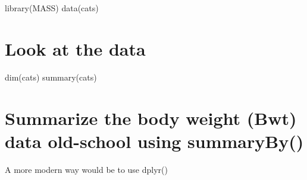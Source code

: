 \documentclass[
]{book}
\newenvironment{Shaded}{\begin{snugshade}}{\end{snugshade}}
\newcommand{\AttributeTok}[1]{\textcolor[rgb]{0.77,0.63,0.00}{#1}}
\newcommand{\CommentTok}[1]{\textcolor[rgb]{0.56,0.35,0.01}{\textit{#1}}}
\newcommand{\FunctionTok}[1]{\textcolor[rgb]{0.00,0.00,0.00}{#1}}
\newcommand{\NormalTok}[1]{#1}
\newcommand{\OtherTok}[1]{\textcolor[rgb]{0.56,0.35,0.01}{#1}}
\newcommand{\SpecialCharTok}[1]{\textcolor[rgb]{0.00,0.00,0.00}{#1}}
\begin{document}
\begin{Shaded}
\begin{Highlighting}[]
\FunctionTok{library}\NormalTok{(MASS)}
\FunctionTok{data}\NormalTok{(cats)}
\end{Highlighting}
\end{Shaded}

\hypertarget{look-at-the-data}{%
\section{Look at the data}\label{look-at-the-data}}

\begin{Shaded}
\begin{Highlighting}[]
\FunctionTok{dim}\NormalTok{(cats)}
\FunctionTok{summary}\NormalTok{(cats)}
\end{Highlighting}
\end{Shaded}

\hypertarget{summarize-the-body-weight-bwt-data-old-school-using-summaryby}{%
\section{Summarize the body weight (Bwt) data old-school using summaryBy()}\label{summarize-the-body-weight-bwt-data-old-school-using-summaryby}}

A more modern way would be to use dplyr()

\begin{Shaded}
\end{Shaded}
\end{document}
